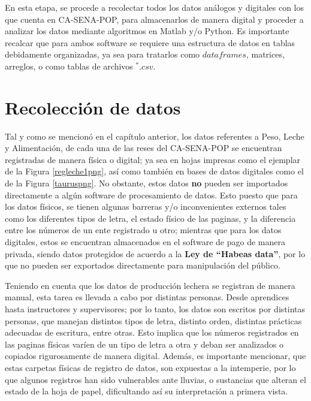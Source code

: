 

En esta etapa, se procede a recolectar todos los datos análogos y digitales con los que cuenta en CA-SENA-POP, para almacenarlos de manera digital y proceder a analizar los datos mediante algoritmos en Matlab y/o Python. Es importante recalcar que para ambos software se requiere una estructura de datos en tablas debidamente organizadas, ya sea para tratarlos como $dataframes$, matrices, arreglos, o como tablas de archivos $^{*}.csv$.

\section{Recolección de datos} \label{datarecol}

Tal y como se mencionó en el capítulo anterior, los datos referentes a Peso, Leche y Alimentación, de cada una de las reses del CA-SENA-POP se encuentran registradas de manera física o digital; ya sea en hojas impresas como el ejemplar de la Figura \ref{regleche1png}, así como también en bases de datos digitales como el de la Figura \ref{tauruspng}. No obstante, estos datos \textbf{no} pueden ser importados directamente a algún software de procesamiento de datos. Esto puesto que para los datos físicos, se tienen algunas barreras y/o inconvenientes externos tales como los diferentes tipos de letra,  el estado físico de las paginas, y la diferencia entre los números de un ente registrado u otro; mientras que para los datos digitales, estos se encuentran almacenados en el software de pago de manera privada, siendo datos protegidos de acuerdo a la \textbf{Ley de ``Habeas data''}, por lo que no pueden ser exportados directamente para manipulación del público. %

Teniendo en cuenta que los datos de producción lechera se registran de manera manual, esta tarea es llevada a cabo por distintas personas. Desde aprendices hasta instructores y supervisores; por lo tanto, los datos son escritos por distintas personas, que manejan distintos tipos de letra, distinto orden, distintas prácticas adecuadas de escritura, entre otras. Esto implica que los números registrados en las paginas físicas varíen de un tipo de letra a otra y deban ser analizados o copiados rigurosamente de manera digital. Además, es importante mencionar, que estas carpetas físicas de registro de datos, son expuestas a la intemperie, por lo que algunos registros han sido vulnerables ante lluvias, o sustancias que alteran el estado de la hoja de papel, dificultando así su interpretación a primera vista.

